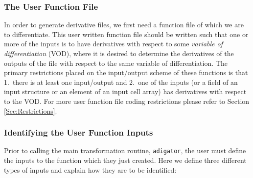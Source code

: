 \documentclass[10pt,pdftex]{article}
\begin{document}
\subsubsection{The User Function File}
In order to generate derivative files, we first need a function file of which we are to differentiate. This user written function file should be written such that one or more of the inputs is to have derivatives with respect to some \emph{variable of differentiation} (VOD), where it is desired to determine the derivatives of the outputs of the file with respect to the same variable of differentiation. The primary restrictions placed on the input/output scheme of these functions is that 1.~there is at least one input/output and 2.~one of the inputs (or a field of an input structure or an element of an input cell array) has derivatives with respect to the VOD. For more user function file coding restrictions please refer to Section \ref{Sec:Restrictions}.
\subsubsection{Identifying the User Function Inputs}\label{SubSec:Inputs}
Prior to calling the main transformation routine, \texttt{adigator}, the user must define the inputs to the function which they just created. Here we define three different types of inputs and explain how they are to be identified:
\end{document}

